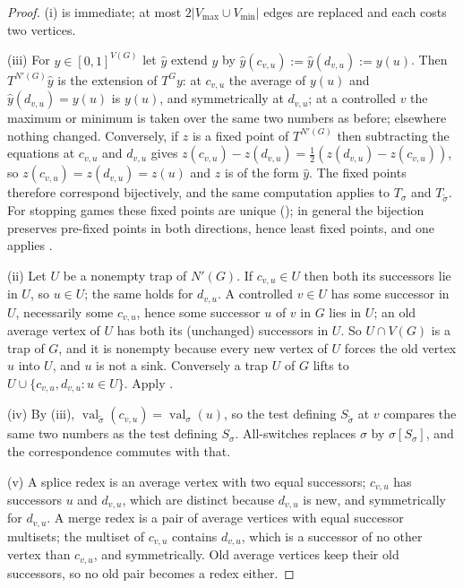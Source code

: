 \documentclass[11pt]{article}
\theoremstyle{plain}
\theoremstyle{definition}
\DeclareMathOperator{\val}{val}
\newcommand{\Vmax}{V_{\max}}
\newcommand{\Vmin}{V_{\min}}
\begin{document}
\begin{proof}
(i) is immediate; at most $2|\Vmax\cup\Vmin|$ edges are replaced and each
costs two vertices.

(iii) For $y\in[0,1]^{V(G)}$ let $\hat y$ extend $y$ by
$\hat y(c_{v,u}):=\hat y(d_{v,u}):=y(u)$. Then $T^{N'(G)}\hat y$ is the
extension of $T^{G}y$: at $c_{v,u}$ the average of $y(u)$ and
$\hat y(d_{v,u})=y(u)$ is $y(u)$, and symmetrically at $d_{v,u}$; at a
controlled $v$ the maximum or minimum is taken over the same two numbers
as before; elsewhere nothing changed. Conversely, if $z$ is a fixed point
of $T^{N'(G)}$ then subtracting the equations at $c_{v,u}$ and
$d_{v,u}$ gives $z(c_{v,u})-z(d_{v,u})=\frac12(z(d_{v,u})-z(c_{v,u}))$,
so $z(c_{v,u})=z(d_{v,u})=z(u)$ and $z$ is of the form $\hat y$. The
fixed points therefore correspond bijectively, and the same computation
applies to $T_\sigma$ and $T_{\tilde\sigma}$. For stopping games these
fixed points are unique (); in general the
bijection preserves pre-fixed points in both directions, hence least
fixed points, and one applies .

(ii) Let $U$ be a nonempty trap of $N'(G)$. If $c_{v,u}\in U$ then both
its successors lie in $U$, so $u\in U$; the same holds for $d_{v,u}$. A
controlled $v\in U$ has some successor in $U$, necessarily some
$c_{v,u}$, hence some successor $u$ of $v$ in $G$ lies in $U$; an old
average vertex of $U$ has both its (unchanged) successors in $U$. So
$U\cap V(G)$ is a trap of $G$, and it is nonempty because every new
vertex of $U$ forces the old vertex $u$ into $U$, and $u$ is not a sink.
Conversely a trap $U$ of $G$ lifts to
$U\cup\{c_{v,u},d_{v,u}:u\in U\}$. Apply .

(iv) By (iii), $\val_{\tilde\sigma}(c_{v,u})=\val_\sigma(u)$, so the test
defining $S_{\tilde\sigma}$ at $v$ compares the same two numbers as the
test defining $S_\sigma$. All-switches replaces $\sigma$ by
$\sigma[S_\sigma]$, and the correspondence commutes with that.

(v) A splice redex is an average vertex with two equal successors;
$c_{v,u}$ has successors $u$ and $d_{v,u}$, which are distinct because
$d_{v,u}$ is new, and symmetrically for $d_{v,u}$. A merge redex is a
pair of average vertices with equal successor multisets; the multiset of
$c_{v,u}$ contains $d_{v,u}$, which is a successor of no other vertex
than $c_{v,u}$, and symmetrically. Old average vertices keep their old
successors, so no old pair becomes a redex either.
\end{proof}
\end{document}

